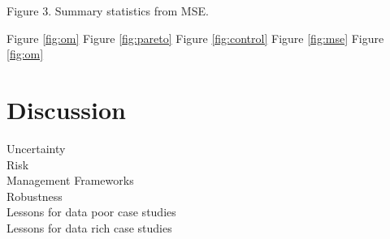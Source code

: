 \documentclass[12pt,doublespacing,a4paper]{ouparticle}
\begin{document}
Figure 3. Summary statistics from MSE.

Figure \ref{fig:om} 
Figure \ref{fig:pareto} 
Figure \ref{fig:control} 
Figure \ref{fig:mse} 
Figure \ref{fig:om} 


\section{Discussion}


\begin{description}
 \item[Uncertainty]  
 \item[Risk]     
 \item[Management Frameworks] 
 \item[Robustness]
 \item[Lessons for data poor case studies]  
 \item[Lessons for data rich case studies] 
\end{description}


\end{document}
